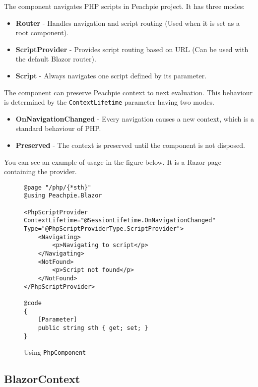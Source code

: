 The component navigates PHP scripts in Peachpie project. It has three modes:
\par
\begin{itemize}
\item \textbf{Router} - Handles navigation and script routing (Used when it is set as a root component).
\item \textbf{ScriptProvider} - Provides script routing based on URL (Can be used with the default Blazor router). 
\item \textbf{Script} - Always navigates one script defined by its parameter. 
\end{itemize}
\par
The component can preserve Peachpie context to next evaluation. This behaviour is determined by the \texttt{ContextLifetime} parameter having two modes.
\par
\begin{itemize}
\item \textbf{OnNavigationChanged} - Every navigation causes a new context, which is a standard behaviour of PHP.
\item \textbf{Preserved} - The context is preserved until the component is not disposed.  
\end{itemize}
\par
You can see an example of usage in the figure below. It is a Razor page containing the provider.
\par
\begin{figure}
\begin{lstlisting}
@page "/php/{*sth}"
@using Peachpie.Blazor

<PhpScriptProvider ContextLifetime="@SessionLifetime.OnNavigationChanged" Type="@PhpScriptProviderType.ScriptProvider">
    <Navigating>
        <p>Navigating to script</p>
    </Navigating>
    <NotFound>
        <p>Script not found</p>
    </NotFound>
</PhpScriptProvider>

@code
{
    [Parameter]
    public string sth { get; set; }
}
\end{lstlisting}
\caption{Using \texttt{PhpComponent}}
\label{img37:phpcomponent}
\end{figure}

\subsection{BlazorContext}

